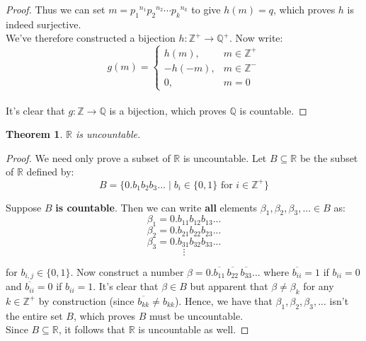 \documentclass[12pt, a4paper, titlepage, twoside]{article}
\newcommand*{\Z}{\mathbb{Z}}
\newcommand*{\Q}{\mathbb{Q}}
\newcommand*{\R}{\mathbb{R}}
\newtheorem*{theorem*}{Theorem}
\begin{document}
\begin{pf}
\begin{proof}
			Thus we can set $m = {p_1}^{n_1} {p_2}^{n_2} \cdots {p_k}^{n_k}$ to give $h(m) = q$, which proves $h$ is indeed surjective.\\
			
			We've therefore constructed a bijection $h : \Z^+ \to \Q^+$. Now write:
			\[ g(m) = \begin{cases} h(m), & m \in \Z^+ \\ -h(-m), & m \in \Z^- \\ 0, & m = 0 \end{cases} \]
			
			\paragraph{}
			It's clear that $g : \Z \to \Q$ is a bijection, which proves $\Q$ is countable.
		\end{proof}
	\end{pf}
	
	\newpage
	
	\begin{pf}
		\label{apA:r-uncount}
		\begin{theorem*}
			$\R$ is uncountable.
		\end{theorem*}

		\tcbline		
		
		\begin{proof}
			We need only prove a subset of $\R$ is uncountable. Let $B \subseteq \R$ be the subset of $\R$ defined by:
			\[ B = \{ 0.b_1b_2b_3... \; \vert \; b_i \in \{0,1\} \text{ for } i \in \Z^+  \} \]
			
			Suppose $B$ \textbf{is countable}. Then we can write \textbf{all} elements $\beta_1, \beta_2, \beta_3, ... \in B$ as:
			\[ \beta_1 = 0.b_{11}b_{12}b_{13}... \]
			\[ \beta_2 = 0.b_{21}b_{22}b_{23}... \]
			\[ \beta_3 = 0.b_{31}b_{32}b_{33}... \]
			\[ \vdots \]
			
			for $b_{i,j} \in \{0, 1\}$. Now construct a number $\beta = 0.\overline{b_{11}} \, \overline{b_{22}} \, \overline{b_{33}}...$
			where $\overline{b_{ii}} = 1$ if $b_{ii} = 0$ and $\overline{b_{ii}} = 0$ if $b_{ii} = 1$. It's clear that $\beta \in B$ but apparent
			that $\beta \neq \beta_k$ for any $k \in \Z^+$ by construction (since $\overline{b_{kk}} \neq b_{kk}$). Hence, we have
			that $\beta_1, \beta_2, \beta_3, ...$ isn't the entire set $B$, which proves $B$ must be uncountable.\\
			
			Since $B \subseteq \R$, it follows that $\R$ is uncountable as well.
		\end{proof}
	\end{pf}
	
\end{document}
